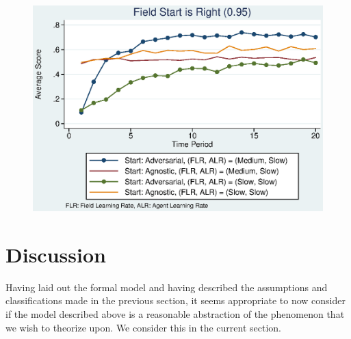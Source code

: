 \documentclass[12pt,letterpaper]{article}
\begin{document}
\begin{figure}[h]
\begin{centering}
  \caption{}
  \includegraphics[width=\textwidth]{frcmedium3b}
  \label{fig:3b}
\end{centering}
\end{figure}

\section{Discussion}
Having laid out the formal model and having described the assumptions and classifications made in the previous section, it seems appropriate to now consider if the model described above is a reasonable abstraction of the phenomenon that we wish to theorize upon. We consider this in the current section.
\end{document}

